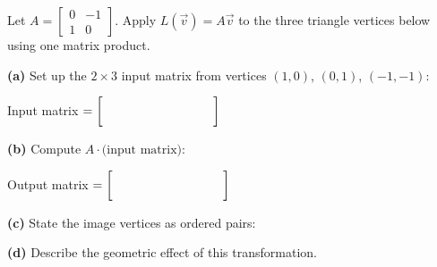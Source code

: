 \documentclass[10pt]{article}
\begin{document}
\vspace{0.1in}

\begin{tcolorbox}[colback=white, colframe=black!40,
    title=\textbf{Tier A --- At Standard},
    fonttitle=\bfseries, arc=2mm, left=3mm, right=3mm, top=2mm, bottom=2mm]
\small
Let $A = \begin{bmatrix}0 & -1 \\ 1 & 0\end{bmatrix}$.
Apply $L(\vec{v})=A\vec{v}$ to the three triangle vertices below using one matrix product.

\vspace{0.06in}
\textbf{(a)} Set up the $2\times 3$ input matrix from vertices $(1,0)$, $(0,1)$, $(-1,-1)$:

\vspace{0.06in}
\hspace{1em} Input matrix $= \begin{bmatrix}\hspace{0.8cm}&\hspace{0.8cm}&\hspace{0.8cm}\\\hspace{0.8cm}&\hspace{0.8cm}&\hspace{0.8cm}\end{bmatrix}$

\vspace{0.12in}
\textbf{(b)} Compute $A \cdot \text{(input matrix)}$:

\vspace{0.06in}
\hspace{1em} Output matrix $= \begin{bmatrix}\hspace{0.8cm}&\hspace{0.8cm}&\hspace{0.8cm}\\\hspace{0.8cm}&\hspace{0.8cm}&\hspace{0.8cm}\end{bmatrix}$

\vspace{0.12in}
\textbf{(c)} State the image vertices as ordered pairs: \blank{7cm}

\vspace{0.10in}
\textbf{(d)} Describe the geometric effect of this transformation.

\end{tcolorbox}
\end{document}
